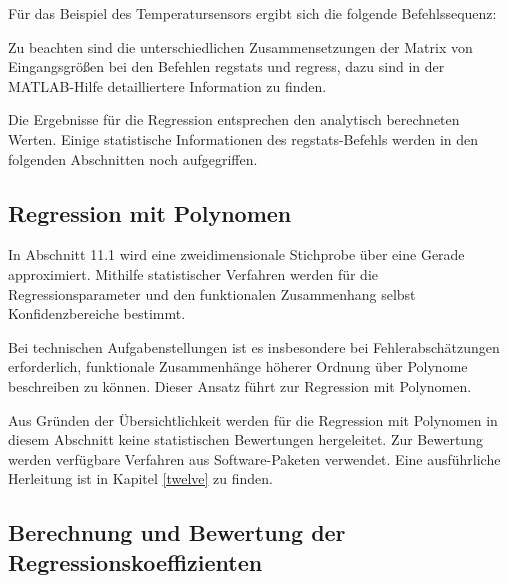 \begin{table}[H]
{\begin{tabular}{| c | c |}
\parbox[c][0.5in][c]{1.8in}{} &
\parbox[c][0.5in][c]{4.7in}{\selectfont{Regress berechnet die Regressionskoeffizienten und deren Konfidenzintervalle}}\\ \hline

\end{tabular}%
}
\label{tab:twelvenine}
\end{table}

\clearpage

\noindent F\"{u}r das Beispiel des Temperatursensors ergibt sich die folgende Befehlssequenz:



\noindent Zu beachten sind die unterschiedlichen Zusammensetzungen der Matrix von Eingangsgr\"{o}{\ss}en bei den Befehlen regstats und regress, dazu sind in der MATLAB-Hilfe detailliertere Information zu finden.\newline

\noindent Die Ergebnisse f\"{u}r die Regression entsprechen den analytisch berechneten Werten. Einige statistische Informationen des regstats-Befehls werden in den folgenden Abschnitten noch aufgegriffen.

\clearpage

\subsection{Regression mit Polynomen}

\noindent In Abschnitt 11.1 wird eine zweidimensionale Stichprobe \"{u}ber eine Gerade approximiert. Mithilfe statistischer Verfahren werden f\"{u}r die Regressionsparameter und den funktionalen Zusammenhang selbst Konfidenzbereiche bestimmt. 

\noindent Bei technischen Aufgabenstellungen ist es insbesondere bei Fehlerabsch\"{a}tzungen erforderlich, funktionale Zusammenh\"{a}nge h\"{o}herer Ordnung \"{u}ber Polynome beschreiben zu k\"{o}nnen. Dieser Ansatz f\"{u}hrt zur Regression mit Polynomen. 

\noindent Aus Gr\"{u}nden der \"{U}bersichtlichkeit werden f\"{u}r die Regression mit Polynomen in diesem Abschnitt keine statistischen Bewertungen hergeleitet. Zur Bewertung werden verf\"{u}gbare Verfahren aus Software-Paketen verwendet. Eine ausf\"{u}hrliche Herleitung ist in Kapitel \ref{twelve} zu finden.

\subsection{Berechnung und Bewertung der Regressionskoeffizienten}

